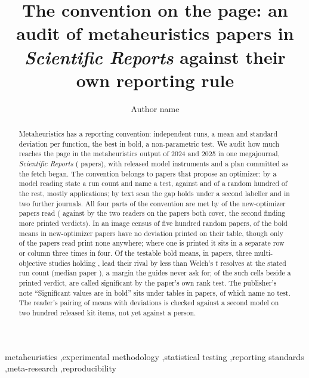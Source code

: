 \documentclass[preprint,review,12pt]{elsarticle}
\begin{document}
\begin{frontmatter}

\title{The convention on the page: an audit of \nOListedSrep{} metaheuristics papers in \emph{Scientific Reports} against their own reporting rule}

\author[1]{Author name}

\begin{abstract}
Metaheuristics has a reporting convention: independent runs, a mean and standard deviation per function, the best in bold, a non-parametric test. We audit how much reaches the page in the metaheuristics output of 2024 and 2025 in one megajournal, \emph{Scientific Reports} (\nOListedSrep{} papers), with released model instruments and a plan committed as the fetch began. The convention belongs to papers that propose an optimizer: by a model reading \nTrNewOptimizerPctRunsStated{} state a run count and \nTrNewOptimizerPctTestNamed{} name a test, against \nTrRandomOtherPctRunsStated{} and \nTrRandomOtherPctTestNamed{} of a random hundred of the rest, mostly applications; by text scan the gap holds under a second labeller and in two further journals. All four parts of the convention are met by \nTrNewOptimizerFullConvention{} of the \nTrNewOptimizerPapers{} new-optimizer papers read (\nTaConventionNewOptimizerFirstPct{} against \nTaConventionNewOptimizerSecondPct{} by the two readers on the papers both cover, the second finding more printed verdicts). In an image census of five hundred random papers, \nCrcMeansNewOptimizerNeither{} \nCrcMeansNewOptimizerNeitherCi{} of the bold means in new-optimizer papers have no deviation printed on their table, though only \nTrNewOptimizerLayoutNonePct{} of the papers read print none anywhere; where one is printed it sits in a separate row or column three times in four. Of the \nCrcMeansTested{} testable bold means, in \nCrcPpmPapers{} papers, three multi-objective studies holding \nCrcPpmTopThreeShare{}, \nCrcMeansFail{} \nCrcMeansFailCi{} lead their rival by less than Welch's $t$ resolves at the stated run count (median paper \nCrcPpmMedianRate{}), a margin the guides never ask for; of the \nVcWelchFailLocated{} such cells beside a printed verdict, \nVcWelchFailPrintedSignificant{} are called significant by the paper's own rank test. The publisher's note ``Significant values are in bold'' sits under tables in \nBnAllWithNote{} papers, \nBnAllNoteNoTestNamed{} of which name no test. The reader's pairing of means with deviations is checked against a second model on two hundred released kit items, not yet against a person.
\end{abstract}

\begin{keyword}
metaheuristics \sep experimental methodology \sep statistical testing \sep reporting standards \sep meta-research \sep reproducibility
\end{keyword}

\end{frontmatter}
\end{document}
